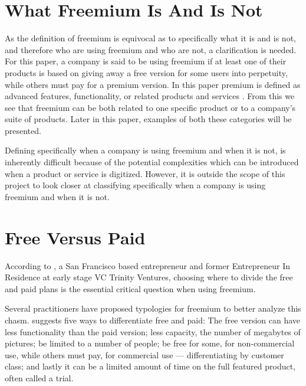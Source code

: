 \section{What Freemium Is And Is Not}

As the definition of freemium is equivocal as to specifically what it is and is not, and therefore who are using freemium and who are not, a clarification is needed. For this paper, a company is said to be using freemium if at least one of their products is based on giving away a free version for some users into perpetuity, while others must pay for a premium version. In this paper premium is defined as advanced features, functionality, or related products and services \citep[in line with][]{pujol2010,iglesia2008,hayes2008}. From this we see that freemium can be both related to one specific product or to a company's suite of products. Later in this paper, examples of both these categories will be presented.

Defining specifically when a company is using freemium and when it is not, is inherently difficult because of the potential complexities which can be introduced when a product or service is digitized. However, it is outside the scope of this project to look closer at classifying specifically when a company is using freemium and when it is not.

\section{Free Versus Paid}
\label{section:context:freepaid}

According to \citet{rekhi2010}, a San Francisco based entrepreneur and former Entrepreneur In Residence at early stage VC Trinity Ventures, choosing where to divide the free and paid plans is the essential critical question when using freemium. 


Several practitioners have proposed typologies for freemium to better analyze this chasm. \citet{anderson2009} suggests five ways to differentiate free and paid: The free version can have less functionality than the paid version; less capacity, \eg the number of megabytes of pictures; be limited to a number of people; be free for some, \eg for non-commercial use, while others must pay, \eg for commercial use --- \ie differentiating by customer class; and lastly it can be a limited amount of time on the full featured product, often called a trial. 

